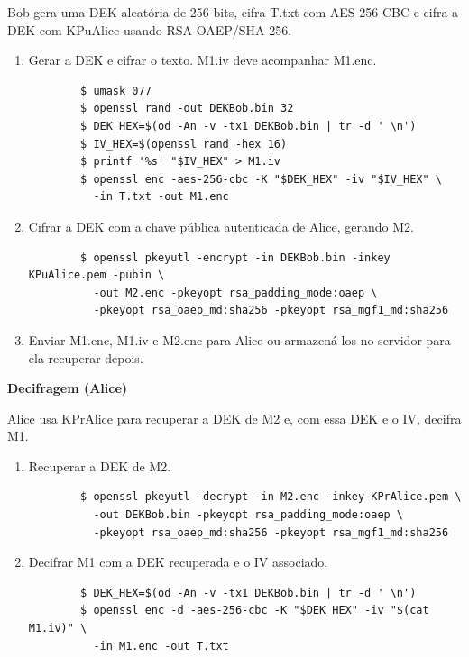Bob gera uma DEK aleatória de 256 bits, cifra T.txt com AES-256-CBC e cifra a DEK com KPuAlice usando RSA-OAEP/SHA-256.
\begin{enumerate}
	\item Gerar a DEK e cifrar o texto. M1.iv deve acompanhar M1.enc.
	\begin{tcolorbox}[width=\textwidth]
	{\small
		\begin{verbatim}
		$ umask 077
		$ openssl rand -out DEKBob.bin 32
		$ DEK_HEX=$(od -An -v -tx1 DEKBob.bin | tr -d ' \n')
		$ IV_HEX=$(openssl rand -hex 16)
		$ printf '%s' "$IV_HEX" > M1.iv
		$ openssl enc -aes-256-cbc -K "$DEK_HEX" -iv "$IV_HEX" \
		  -in T.txt -out M1.enc
		\end{verbatim}
	}
	\end{tcolorbox}

	\item Cifrar a DEK com a chave pública autenticada de Alice, gerando M2.
	\begin{tcolorbox}[width=\textwidth]
	{\small
		\begin{verbatim}
		$ openssl pkeyutl -encrypt -in DEKBob.bin -inkey KPuAlice.pem -pubin \
		  -out M2.enc -pkeyopt rsa_padding_mode:oaep \
		  -pkeyopt rsa_oaep_md:sha256 -pkeyopt rsa_mgf1_md:sha256
		\end{verbatim}
	}
	\end{tcolorbox}

	\item Enviar M1.enc, M1.iv e M2.enc para Alice ou armazená-los no servidor para ela recuperar depois.
\end{enumerate}

\textbf{Decifragem (Alice)}

Alice usa KPrAlice para recuperar a DEK de M2 e, com essa DEK e o IV, decifra M1.
\begin{enumerate}
	\item Recuperar a DEK de M2.
	\begin{tcolorbox}[width=\textwidth]
	{\small
		\begin{verbatim}
		$ openssl pkeyutl -decrypt -in M2.enc -inkey KPrAlice.pem \
		  -out DEKBob.bin -pkeyopt rsa_padding_mode:oaep \
		  -pkeyopt rsa_oaep_md:sha256 -pkeyopt rsa_mgf1_md:sha256
		\end{verbatim}
	}
	\end{tcolorbox}

	\item Decifrar M1 com a DEK recuperada e o IV associado.
	\begin{tcolorbox}[width=\textwidth]
	{\small
		\begin{verbatim}
		$ DEK_HEX=$(od -An -v -tx1 DEKBob.bin | tr -d ' \n')
		$ openssl enc -d -aes-256-cbc -K "$DEK_HEX" -iv "$(cat M1.iv)" \
		  -in M1.enc -out T.txt
		\end{verbatim}
	}
	\end{tcolorbox}
\end{enumerate}

